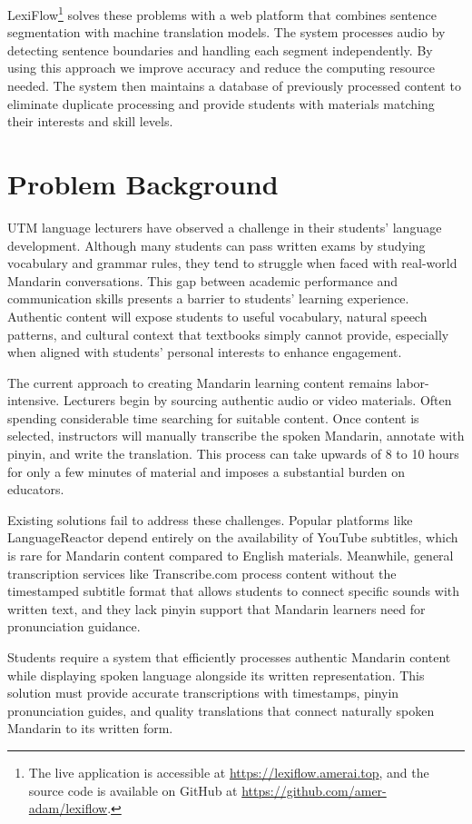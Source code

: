 \documentclass[oneside]{utmthesis}
\begin{document}
LexiFlow\footnote{The live application is accessible at \url{https://lexiflow.amerai.top}, and the source code is available on GitHub at \url{https://github.com/amer-adam/lexiflow}.} solves these problems with a web platform that combines sentence segmentation with machine translation models. The system processes audio by detecting sentence boundaries and handling each segment independently. By using this approach we improve accuracy and reduce the computing resource needed. The system then maintains a database of previously processed content to eliminate duplicate processing and provide students with materials matching their interests and skill levels.
\section{Problem Background}
UTM language lecturers have observed a challenge in their students' language development. Although many students can pass written exams by studying vocabulary and grammar rules, they tend to struggle when faced with real-world Mandarin conversations. This gap between academic performance and communication skills presents a barrier to students' learning experience. Authentic content will expose students to useful vocabulary, natural speech patterns, and cultural context that textbooks simply cannot provide, especially when aligned with students' personal interests to enhance engagement.

The current approach to creating Mandarin learning content remains labor-intensive. Lecturers begin by sourcing authentic audio or video materials. Often spending considerable time searching for suitable content. Once content is selected, instructors will manually transcribe the spoken Mandarin, annotate with pinyin, and write the translation. This process can take upwards of 8 to 10 hours for only a few minutes of material and imposes a substantial burden on educators.

Existing solutions fail to address these challenges. Popular platforms like LanguageReactor depend entirely on the availability of YouTube subtitles, which is rare for Mandarin content compared to English materials. Meanwhile, general transcription services like Transcribe.com process content without the timestamped subtitle format that allows students to connect specific sounds with written text, and they lack pinyin support that Mandarin learners need for pronunciation guidance.

Students require a system that efficiently processes authentic Mandarin content while displaying spoken language alongside its written representation. This solution must provide accurate transcriptions with timestamps, pinyin pronunciation guides, and quality translations that connect naturally spoken Mandarin to its written form.
\end{document}
